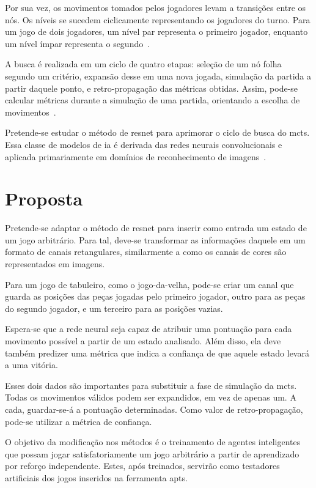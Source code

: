 \documentclass[12pt]{article}
\begin{document}
Por sua vez, os movimentos tomados pelos jogadores levam a transições entre os nós.
Os níveis se sucedem ciclicamente representando os jogadores do turno.
Para um jogo de dois jogadores, um nível par representa o primeiro jogador, enquanto um nível ímpar representa o segundo~\cite{mcts-swiechowski}.

A busca é realizada em um ciclo de quatro etapas: seleção de um nó folha segundo um critério, expansão desse em uma nova jogada, simulação da partida a partir daquele ponto, e retro-propagação das métricas obtidas.
Assim, pode-se calcular métricas durante a simulação de uma partida, orientando a escolha de movimentos~\cite{mcts-swiechowski}.

Pretende-se estudar o método de \gls{resnet} para aprimorar o ciclo de busca do \gls{mcts}.
Essa classe de modelos de \gls{ia} é derivada das redes neurais convolucionais e aplicada primariamente em domínios de reconhecimento de imagens~\cite{he2015deep,zewen2022convolutional}.

\section{Proposta}%
\label{sec:proposta}

Pretende-se adaptar o método de \gls{resnet} para inserir como entrada um estado de um jogo arbitrário.
Para tal, deve-se transformar as informações daquele em um formato de canais retangulares, similarmente a como os canais de cores são representados em imagens.

Para um jogo de tabuleiro, como o jogo-da-velha, pode-se criar um canal que guarda as posições das peças jogadas pelo primeiro jogador, outro para as peças do segundo jogador, e um terceiro para as posições vazias.

Espera-se que a rede neural seja capaz de atribuir uma pontuação para cada movimento possível a partir de um estado analisado.
Além disso, ela deve também predizer uma métrica que indica a confiança de que aquele estado levará a uma vitória.

Esses dois dados são importantes para substituir a fase de simulação da \gls{mcts}.
Todas os movimentos válidos podem ser expandidos, em vez de apenas um.
A cada, guardar-se-á a pontuação determinadas.
Como valor de retro-propagação, pode-se utilizar a métrica de confiança.

O objetivo da modificação nos métodos é o treinamento de agentes inteligentes que possam jogar satisfatoriamente um jogo arbitrário a partir de aprendizado por reforço independente.
Estes, após treinados, servirão como testadores artificiais dos jogos inseridos na ferramenta \gls{apts}.
\end{document}
